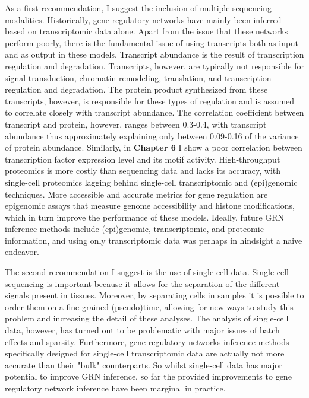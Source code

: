 As a first recommendation, I suggest the inclusion of multiple sequencing modalities. Historically, gene regulatory networks have mainly been inferred based on transcriptomic data alone. Apart from the issue that these networks perform poorly\cite{McCalla_2021,Chen_2018,Pratapa_2020}, there is the fundamental issue of using transcripts both as input and as output in these models. Transcript abundance is the result of transcription regulation and degradation. Transcripts, however, are typically not responsible for signal transduction, chromatin remodeling, translation, and transcription regulation and degradation. The protein product synthesized from these transcripts, however, is responsible for these types of regulation and is assumed to correlate closely with transcript abundance. The correlation coefficient between transcript and protein, however, ranges between 0.3-0.4\cite{Fortelny2017,Franks2017}, with transcript abundance thus approximately explaining only between 0.09-0.16 of the variance of protein abundance. Similarly, in \textbf{Chapter 6} I show a poor correlation between transcription factor expression level and its motif activity. High-throughput proteomics is more costly than sequencing data and lacks its accuracy, with single-cell proteomics lagging behind single-cell transcriptomic and (epi)genomic techniques\cite{Bennett2023}. More accessible and accurate metrics for gene regulation are epigenomic assays that measure genome accessibility and histone modifications\cite{Xu_2020,Kamal_2021,Aibar_2017}, which in turn improve the performance of these models. Ideally, future GRN inference methods include (epi)genomic, transcriptomic, and proteomic information, and using only transcriptomic data was perhaps in hindsight a naive endeavor.

The second recommendation I suggest is the use of single-cell data. Single-cell sequencing is important because it allows for the separation of the different signals present in tissues. Moreover, by separating cells in samples it is possible to order them on a fine-grained (pseudo)time\cite{Saelens2019}, allowing for new ways to study this problem and increasing the detail of these analyses. The analysis of single-cell data, however, has turned out to be problematic with major issues of batch effects \cite{Tran2020,Haghverdi2018,Lhnemann2020} and sparsity\cite{Lhnemann2020,Bouland2023}. Furthermore, gene regulatory networks inference methods specifically designed for single-cell transcriptomic data are actually not more accurate than their "bulk" counterparts\cite{Chen_2018}. So whilst single-cell data has major potential to improve GRN inference, so far the provided improvements to gene regulatory network inference have been marginal in practice. 

